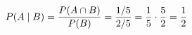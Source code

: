 \documentclass[preview]{standalone}
\begin{document}
\begin{align*}
\special{dvisvgm:raw <g id='unique000'>}P(A\mid B)=\frac{P(A\cap B)}{P(B)}=\frac{1/5}{2/5}=\frac{1}{5}\cdot\frac{5}{2}=\frac{1}{2}\special{dvisvgm:raw </g>}
\end{align*}
\end{document}
